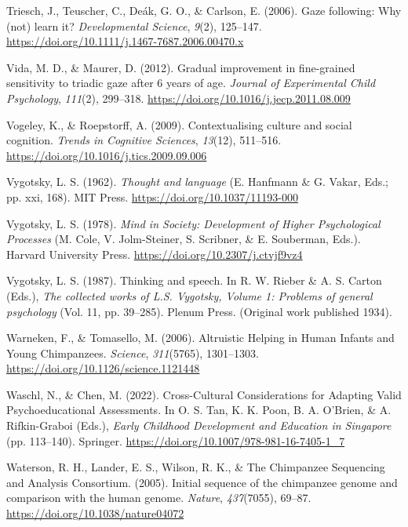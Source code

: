 \documentclass[
]{scrbook}
\newlength{\cslhangindent}
\newenvironment{CSLReferences}[2] %
 {\begin{list}{}{%
  \setlength{\itemindent}{0pt}
  \setlength{\leftmargin}{0pt}
  \setlength{\parsep}{0pt}
  \ifodd #1
   \setlength{\leftmargin}{\cslhangindent}
   \setlength{\itemindent}{-1\cslhangindent}
  \fi
  \setlength{\itemsep}{#2\baselineskip}}}
 {\end{list}}
\begin{document}
\begin{CSLReferences}{1}{0}
Triesch, J., Teuscher, C., Deák, G. O., \& Carlson, E. (2006). Gaze following: Why (not) learn it? \emph{Developmental Science}, \emph{9}(2), 125--147. \url{https://doi.org/10.1111/j.1467-7687.2006.00470.x}

Vida, M. D., \& Maurer, D. (2012). Gradual improvement in fine-grained sensitivity to triadic gaze after 6 years of age. \emph{Journal of Experimental Child Psychology}, \emph{111}(2), 299--318. \url{https://doi.org/10.1016/j.jecp.2011.08.009}

Vogeley, K., \& Roepstorff, A. (2009). Contextualising culture and social cognition. \emph{Trends in Cognitive Sciences}, \emph{13}(12), 511--516. \url{https://doi.org/10.1016/j.tics.2009.09.006}

Vygotsky, L. S. (1962). \emph{Thought and language} (E. Hanfmann \& G. Vakar, Eds.; pp. xxi, 168). MIT Press. \url{https://doi.org/10.1037/11193-000}

Vygotsky, L. S. (1978). \emph{Mind in {Society}: {Development} of {Higher Psychological Processes}} (M. Cole, V. Jolm-Steiner, S. Scribner, \& E. Souberman, Eds.). Harvard University Press. \url{https://doi.org/10.2307/j.ctvjf9vz4}

Vygotsky, L. S. (1987). Thinking and speech. In R. W. Rieber \& A. S. Carton (Eds.), \emph{The collected works of {L}.{S}. {Vygotsky}, {Volume} 1: {Problems} of general psychology} (Vol. 11, pp. 39--285). Plenum Press. (Original work published 1934).

Warneken, F., \& Tomasello, M. (2006). Altruistic {Helping} in {Human Infants} and {Young Chimpanzees}. \emph{Science}, \emph{311}(5765), 1301--1303. \url{https://doi.org/10.1126/science.1121448}

Waschl, N., \& Chen, M. (2022). Cross-{Cultural Considerations} for {Adapting Valid Psychoeducational Assessments}. In O. S. Tan, K. K. Poon, B. A. O'Brien, \& A. Rifkin-Graboi (Eds.), \emph{Early {Childhood Development} and {Education} in {Singapore}} (pp. 113--140). Springer. \url{https://doi.org/10.1007/978-981-16-7405-1_7}

Waterson, R. H., Lander, E. S., Wilson, R. K., \& The Chimpanzee Sequencing and Analysis Consortium. (2005). Initial sequence of the chimpanzee genome and comparison with the human genome. \emph{Nature}, \emph{437}(7055), 69--87. \url{https://doi.org/10.1038/nature04072}


\end{CSLReferences}
\end{document}
